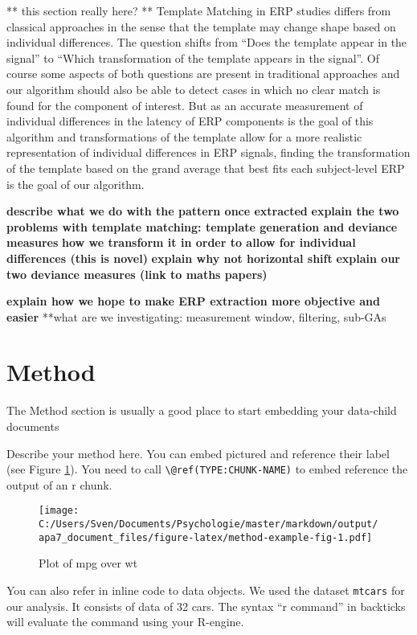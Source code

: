 \documentclass[
  man,floatsintext]{apa7}
\begin{document}
** this section really here? **
Template Matching in ERP studies differs from classical approaches in the sense that the template may change shape based on individual differences. The question shifts from ``Does the template appear in the signal'' to ``Which transformation of the template appears in the signal''. Of course some aspects of both questions are present in traditional approaches and our algorithm should also be able to detect cases in which no clear match is found for the component of interest. But as an accurate measurement of individual differences in the latency of ERP components is the goal of this algorithm and transformations of the template allow for a more realistic representation of individual differences in ERP signals, finding the transformation of the template based on the grand average that best fits each subject-level ERP is the goal of our algorithm.

\textbf{describe what we do with the pattern once extracted}
\textbf{explain the two problems with template matching: template generation and deviance measures}
\textbf{how we transform it in order to allow for individual differences (this is novel)}
\textbf{explain why not horizontal shift}
\textbf{explain our two deviance measures (link to maths papers)}

\textbf{explain how we hope to make ERP extraction more objective and easier}
**what are we investigating: measurement window, filtering, sub-GAs

\hypertarget{method}{%
\section{Method}\label{method}}

The Method section is usually a good place to start embedding your data-child documents

Describe your method here. You can embed pictured and reference their label (see Figure \ref{fig:method-example-fig}). You need to call \texttt{\textbackslash{}@ref(TYPE:CHUNK-NAME)} to embed reference the output of an r chunk.

\begin{figure}
\centering
\texttt{[image: C:/Users/Sven/Documents/Psychologie/master/markdown/output/apa7\_document\_files/figure-latex/method-example-fig-1.pdf]}
\caption{\label{fig:method-example-fig}Plot of mpg over wt}
\end{figure}

You can also refer in inline code to data objects. We used the dataset \texttt{mtcars} for our analysis. It consists of data of 32 cars. The syntax ``r command'' in backticks will evaluate the command using your R-engine.
\end{document}
